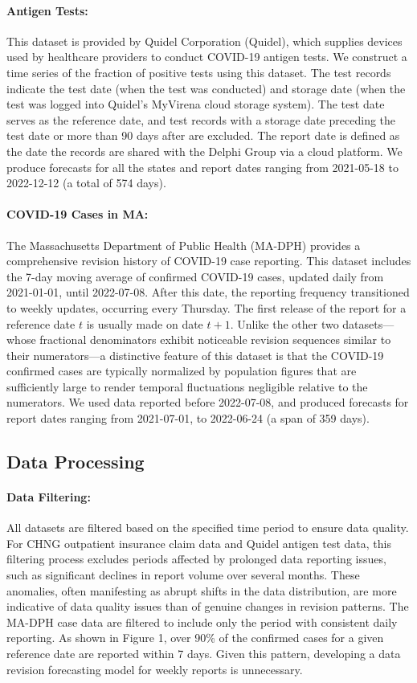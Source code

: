 \paragraph{Antigen Tests:}
This dataset is provided by Quidel Corporation (Quidel), which supplies devices used by healthcare providers to conduct COVID-19 antigen tests. We construct a time series of the fraction of positive tests using this dataset. The test records indicate the test date (when the test was conducted) and storage date (when the test was logged into Quidel's MyVirena cloud storage system). The test date serves as the reference date, and test records with a storage date preceding the test date or more than 90 days after are excluded. The report date is defined as the date the records are shared with the Delphi Group via a cloud platform. We produce forecasts for all the states and report dates ranging from 2021-05-18 to 2022-12-12 (a total of 574 days). 

\paragraph{COVID-19 Cases in MA:}
The Massachusetts Department of Public Health (MA-DPH) provides a comprehensive revision history of COVID-19 case reporting\cite{mass_dph_archive}. This dataset includes the 7-day moving average of confirmed COVID-19 cases, updated daily from 2021-01-01, until 2022-07-08. After this date, the reporting frequency transitioned to weekly updates, occurring every Thursday. The first release of the report for a reference date \( t \) is usually made on date \( t+1 \). Unlike the other two datasets—whose fractional denominators exhibit noticeable revision sequences similar to their numerators—a distinctive feature of this dataset is that the COVID-19 confirmed cases are typically normalized by population figures that are sufficiently large to render temporal fluctuations negligible relative to the numerators. We used data reported before 2022-07-08, and produced forecasts for report dates ranging from 2021-07-01, to 2022-06-24 (a span of 359 days).

\subsection{Data Processing}
\paragraph{Data Filtering:}
All datasets are filtered based on the specified time period to ensure data quality. For CHNG outpatient insurance claim data and Quidel antigen test data, this filtering process excludes periods affected by prolonged data reporting issues, such as significant declines in report volume over several months. These anomalies, often manifesting as abrupt shifts in the data distribution, are more indicative of data quality issues than of genuine changes in revision patterns. The MA-DPH case data are filtered to include only the period with consistent daily reporting. As shown in Figure 1, over 90\% of the confirmed cases for a given reference date are reported within 7 days. Given this pattern, developing a data revision forecasting model for weekly reports is unnecessary.

